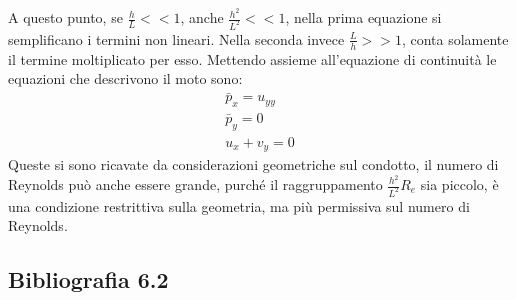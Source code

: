 %
A questo punto, se $\frac{h}{L} << 1$, anche $\frac{h^2}{L^2} << 1$, nella prima equazione si semplificano i termini non lineari.
Nella seconda invece $\frac{L}{h} >> 1$, conta solamente il termine moltiplicato per esso.
Mettendo assieme all'equazione di continuità le equazioni che descrivono il moto sono:
%
	\begin{equation*}
		\begin{gathered}
			\bar{p}_x = u_{yy}\\
			\bar{p}_y = 0\\
			u_x + v_y = 0
		\end{gathered}
	\end{equation*} 
%
Queste si sono ricavate da considerazioni geometriche sul condotto, il numero di Reynolds può anche essere grande, purché il raggruppamento $\frac{h^2}{L^2} R_e$ sia piccolo, è una condizione restrittiva sulla geometria, ma più permissiva sul numero di Reynolds.

\subsection*{Bibliografia 6.2}
\cite[Cap.\ 9.1]{PnueliGutfinger}
